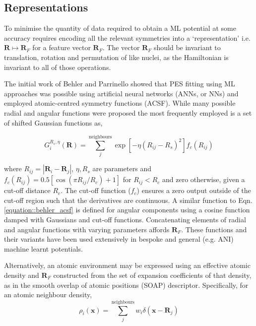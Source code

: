 \documentclass[main.tex]{subfiles}
\begin{document}
\subsection{Representations}

To minimise the quantity of data required to obtain a ML potential at some accuracy requires encoding all the relevant symmetries into a `representation' i.e. $\boldsymbol{R} \mapsto \boldsymbol{R}_F$ for a feature vector $\boldsymbol{R}_F$. The vector $\boldsymbol{R}_F$ should be invariant to translation, rotation and permutation of like nuclei, as the Hamiltonian is invariant to all of those operations.

The initial work of Behler and Parrinello showed that PES fitting using ML approaches was possible using artificial neural networks (ANNs, or NNs) and employed atomic-centred symmetry functions (ACSF).\cite{Behler2007, Behler2011} While many possible radial and angular functions were proposed the most frequently employed is a set of shifted Gaussian functions as,

\begin{equation}
	G^{R_s, \eta}_i(\boldsymbol{R}) = \sum_j^\text{neighbours} \exp\left[-\eta (R_{ij}- R_s)^2 \right] f_c({R_{ij}})
	\label{equation::behler_acsf}
\end{equation}

where $R_{ij} = |\boldsymbol{R}_i - \boldsymbol{R}_j|$, $\eta, R_s$ are parameters and $f_c(R_{ij}) = 0.5[\cos(\pi R_{ij} / R_c) + 1]$ for $R_{ij} < R_c$ and zero otherwise, given a cut-off distance $R_c$. The cut-off function ($f_c$) ensures a zero output outside of the cut-off region such that the derivatives are continuous. A similar function to Eqn. 
\eqref{equation::behler_acsf} is defined for angular components using a cosine function damped with Gaussians and cut-off functions. Concatenating elements of radial and angular functions with varying parameters affords $\boldsymbol{R}_F$. These functions and their variants have been used extensively in bespoke and general (e.g. ANI\cite{Smith2017}) machine learnt potentials.



Alternatively, an atomic environment may be expressed using an effective atomic density and $\boldsymbol{R}_F$ constructed from the set of expansion coefficients of that density, as in the smooth overlap of atomic positions (SOAP) descriptor.\cite{Bartok2013} Specifically, for an atomic neighbour density,
\begin{equation}
	\rho_i(\boldsymbol{x}) = \sum_j^\text{neighbours} w_i \delta(\boldsymbol{x} - \boldsymbol{R}_j)
\end{equation}
\end{document}
